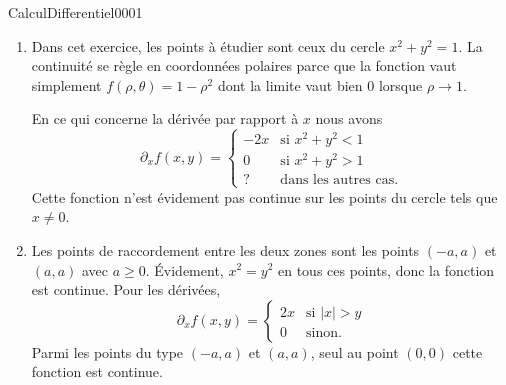 \begin{corrige}{CalculDifferentiel0001}
\begin{enumerate}
		\item
			Dans cet exercice, les points à étudier sont ceux du cercle $x^2+y^2=1$. La continuité se règle en coordonnées polaires parce que la fonction vaut simplement $f(\rho,\theta)=1-\rho^2$ dont la limite vaut bien $0$ lorsque $\rho\to 1$.

			En ce qui concerne la dérivée par rapport à $x$ nous avons
			\begin{equation}
				\partial_xf(x,y)=\begin{cases}
					-2x	&	\text{si $x^2+y^2<1$}\\
					0	&	 \text{si $x^2+y^2>1$}\\
					?	&	\text{dans les autres cas}.
				\end{cases}
			\end{equation}
			Cette fonction n'est évidement pas continue sur les points du cercle tels que $x\neq 0$.

		\item
			Les points de raccordement entre les deux zones sont les points $(-a,a)$ et $(a,a)$ avec $a\geq 0$. Évidement, $x^2=y^2$ en tous ces points, donc la fonction est continue. Pour les dérivées,
			\begin{equation}
				\partial_xf(x,y)=\begin{cases}
					2x	&	\text{si $| x |>y$}\\
					0	&	 \text{sinon.}
				\end{cases}
			\end{equation}
			Parmi les points du type $(-a,a)$ et $(a,a)$, seul au point $(0,0)$ cette fonction est continue.
			
	\end{enumerate}

\end{corrige}
